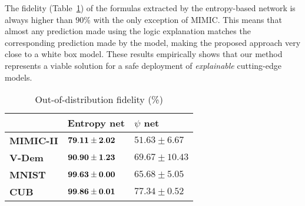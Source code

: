 The fidelity (Table~\ref{tab:fidelity})
of the formulas extracted by the entropy-based network is always higher than $90\%$ with the only exception of MIMIC. This means that almost any prediction made using the logic explanation matches the corresponding prediction made by the model, making the proposed approach very close to a white box model.
These results empirically shows that our method represents a viable solution for a safe %
deployment of \textit{explainable} cutting-edge models.



\begin{table}[t]
\small
\centering
\begin{tabular}{lll}
\toprule
{} &         Entropy net  &        $\psi$ net \\
\midrule
\textbf{MIMIC-II     } &  ${\bf 79.11  \pm 2.02}$ &   $51.63 \pm 6.67$ \\
\textbf{V-Dem         }&  ${\bf 90.90 \pm 1.23}$ &  $69.67 \pm 10.43$ \\
\textbf{MNIST}         &  ${\bf 99.63 \pm 0.00}$ & $65.68 \pm 5.05$ \\
\textbf{CUB         }  &  ${\bf 99.86 \pm 0.01}$ &  $77.34 \pm 0.52$ \\
\bottomrule
\end{tabular}
\caption{Out-of-distribution fidelity (\%)}
\label{tab:fidelity}
\end{table}

